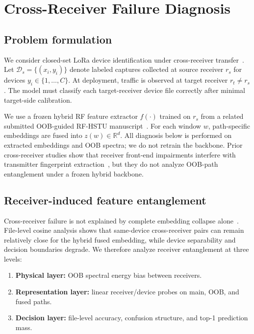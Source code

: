 \section{Cross-Receiver Failure Diagnosis}
\label{sec:diagnosis}

\subsection{Problem formulation}
We consider closed-set LoRa device identification under cross-receiver transfer~\cite{elmaghbub2021lora_wild,yang2024cross_receiver_da,yang2025scrffi}.
Let $\mathcal{D}_s=\{(x_i,y_i)\}$ denote labeled captures collected at source receiver $r_s$ for devices $y_i\in\{1,\ldots,C\}$.
At deployment, traffic is observed at target receiver $r_t\neq r_s$.
The model must classify each target-receiver device file correctly after minimal target-side calibration.

We use a frozen hybrid RF feature extractor $f(\cdot)$ trained on $r_s$ from a related submitted OOB-guided RF-HSTU manuscript~\cite{paper1_placeholder}.
For each window $w$, path-specific embeddings are fused into $z(w)\in\mathbb{R}^d$.
All diagnosis below is performed on extracted embeddings and OOB spectra; we do not retrain the backbone.
Prior cross-receiver studies show that receiver front-end impairments interfere with transmitter fingerprint extraction~\cite{shen2024receiveragnostic,ma2025receiver_independent_rffi,alshawabka2020exposing_fingerprint}, but they do not analyze OOB-path entanglement under a frozen hybrid backbone.

\subsection{Receiver-induced feature entanglement}
Cross-receiver failure is not explained by complete embedding collapse alone~\cite{cekic2020robust_wireless_fingerprinting}.
File-level cosine analysis shows that same-device cross-receiver pairs can remain relatively close for the hybrid fused embedding, while device separability and decision boundaries degrade.
We therefore analyze receiver entanglement at three levels:
\begin{enumerate}
  \item \textbf{Physical layer:} OOB spectral energy bias between receivers.
  \item \textbf{Representation layer:} linear receiver/device probes on main, OOB, and fused paths.
  \item \textbf{Decision layer:} file-level accuracy, confusion structure, and top-1 prediction mass.
\end{enumerate}

